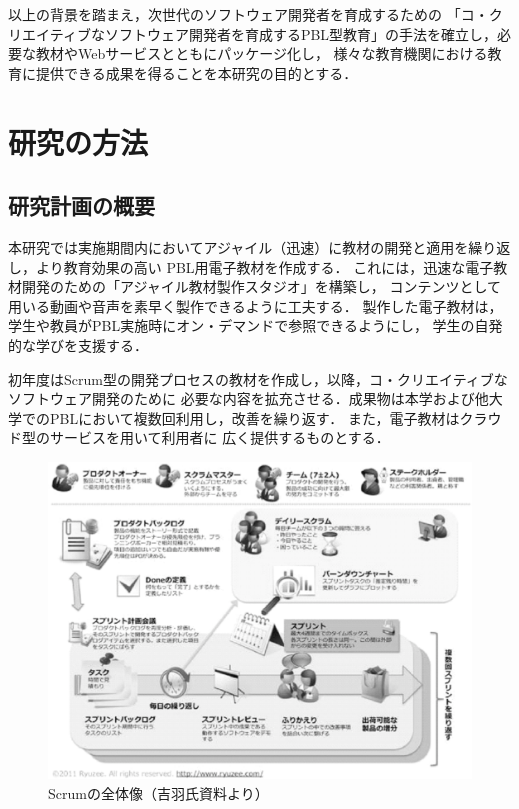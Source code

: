 \documentclass[a4j,9pt,twoside,twocolumn]{jsarticle}
\begin{document}
    以上の背景を踏まえ，次世代のソフトウェア開発者を育成するための
    「コ・クリエイティブなソフトウェア開発者を育成するPBL型教育」の手法を確立し，必要な教材やWebサービスとともにパッケージ化し，
    様々な教育機関における教育に提供できる成果を得ることを本研究の目的とする．

\section{研究の方法}\label{sec:method}
\subsection{研究計画の概要}
	本研究では実施期間内においてアジャイル（迅速）に教材の開発と適用を繰り返し，より教育効果の高い
	PBL用電子教材を作成する．
	これには，迅速な電子教材開発のための「アジャイル教材製作スタジオ」を構築し，
	コンテンツとして用いる動画や音声を素早く製作できるように工夫する．
	製作した電子教材は，学生や教員がPBL実施時にオン・デマンドで参照できるようにし，
	学生の自発的な学びを支援する．

	初年度はScrum型の開発プロセスの教材を作成し，以降，コ・クリエイティブなソフトウェア開発のために
	必要な内容を拡充させる．成果物は本学および他大学でのPBLにおいて複数回利用し，改善を繰り返す．
	また，電子教材はクラウド型のサービスを用いて利用者に
	広く提供するものとする．

\begin{figure}
\begin{center}
\includegraphics[width=\linewidth]{figs/scrum.eps}
\caption{Scrumの全体像（吉羽氏資料より）}
\label{fig:scrum}
\end{center}
\end{figure}	
\end{document}
